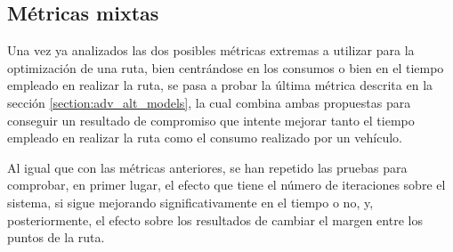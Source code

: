 \documentclass[11pt,spanish,listoffigures,listoftables]{tfgetsinf}
\begin{document}
\newpage
\subsection{Métricas mixtas}
\label{section:mix_model_tests}
Una vez ya analizados las dos posibles métricas extremas a utilizar para la optimización de una ruta, bien centrándose en los consumos o bien en el tiempo empleado en realizar la ruta, se pasa a probar la última métrica descrita en la sección \ref{section:adv_alt_models}, la cual combina ambas propuestas para conseguir un resultado de compromiso que intente mejorar tanto el tiempo empleado en realizar la ruta como el consumo realizado por un vehículo.

Al igual que con las métricas anteriores, se han repetido las pruebas para comprobar, en primer lugar, el efecto que tiene el número de iteraciones sobre el sistema, si sigue mejorando significativamente en el tiempo o no, y, posteriormente, el efecto sobre los resultados de cambiar el margen entre los puntos de la ruta.
\end{document}
